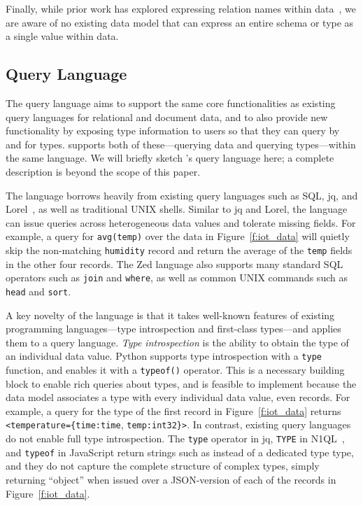 Finally, while prior work has explored expressing relation names within data~, we are aware of no existing data model that can express an entire schema or type as a single value within data.

\subsection{\sys{} Query Language} \label{ss:zed_query_language}

The \sys{} query language aims to support the same core functionalities as existing query languages for relational and document data, and to also provide new functionality by exposing type information to users so that they can query by and for types. \sys{} supports both of these---querying data and querying types---within the same language. We will briefly sketch \sys{}'s query language here; a complete description is beyond the scope of this paper.

The \sys{} language borrows heavily from existing query languages such as SQL, jq, and Lorel~, as well as traditional UNIX shells. Similar to jq and Lorel, the \sys{} language can issue queries across heterogeneous data values and tolerate missing fields. For example, a query for \texttt{avg(temp)} over the data in Figure~\ref{f:iot_data} will quietly skip the non-matching \texttt{humidity} record and return the average of the \texttt{temp} fields in the other four records. The Zed language also supports many standard SQL operators such as \texttt{join} and \texttt{where}, as well as common UNIX commands such as \texttt{head} and \texttt{sort}.

A key novelty of the \sys{} language is that it takes well-known features of existing programming languages---type introspection and first-class types---and applies them to a query language. {\em Type introspection} is the ability to obtain the type of an individual data value. Python supports type introspection with a \texttt{type} function, and \sys{} enables it with a \texttt{typeof()} operator. This is a necessary building block to enable rich queries about types, and is feasible to implement because the \sys{} data model associates a type with every individual data value, even records. For example, a query for the type of the first record in Figure~\ref{f:iot_data} returns \texttt{<temperature=\{time:time}, \texttt{temp:int32\}>}.
In contrast, existing query languages do not enable full type introspection. The \texttt{type} operator in jq, \texttt{TYPE} in N1QL~\cite{n1ql}, and \texttt{typeof} in JavaScript return strings such as  instead of a dedicated type type, and they do not capture the complete structure of complex types, simply returning ``object'' when issued over a JSON-version of each of the records in Figure~\ref{f:iot_data}.

